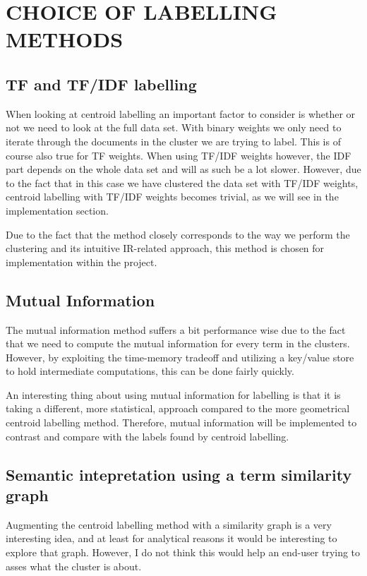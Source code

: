 \documentclass[letterpaper, 10 pt, conference]{ieeeconf}
\begin{document}
\section{CHOICE OF LABELLING METHODS}

\subsection{TF and TF/IDF labelling}
When looking at centroid labelling an important factor to consider is whether or
not we need to look at the full data set. With binary weights we only need to
iterate through the documents in the cluster we are trying to label. This is of
course also true for TF weights. When using TF/IDF weights however, the IDF part
depends on the whole data set and will as such be a lot slower. However, due to
the fact that in this case we have clustered the data set with TF/IDF weights,
centroid labelling with TF/IDF weights becomes trivial, as we will see in the
implementation section.

Due to the fact that the method closely corresponds to the way we perform the
clustering and its intuitive IR-related approach, this method is chosen for
implementation within the project.

\subsection{Mutual Information}
The mutual information method suffers a bit performance wise due to the fact
that we need to compute the mutual information for every term in the clusters.
However, by exploiting the time-memory tradeoff and utilizing a key/value store
to hold intermediate computations, this can be done fairly quickly.

An interesting thing about using mutual information for labelling is that it is
taking a different, more statistical, approach compared to the more geometrical
centroid labelling method. Therefore, mutual information will be implemented to
contrast and compare with the labels found by centroid labelling.

\subsection{Semantic intepretation using a term similarity graph}
Augmenting the centroid labelling method with a similarity graph is a very
interesting idea, and at least for analytical reasons it would be interesting to
explore that graph. However, I do not think this would help an end-user trying
to asses what the cluster is about.
\end{document}

